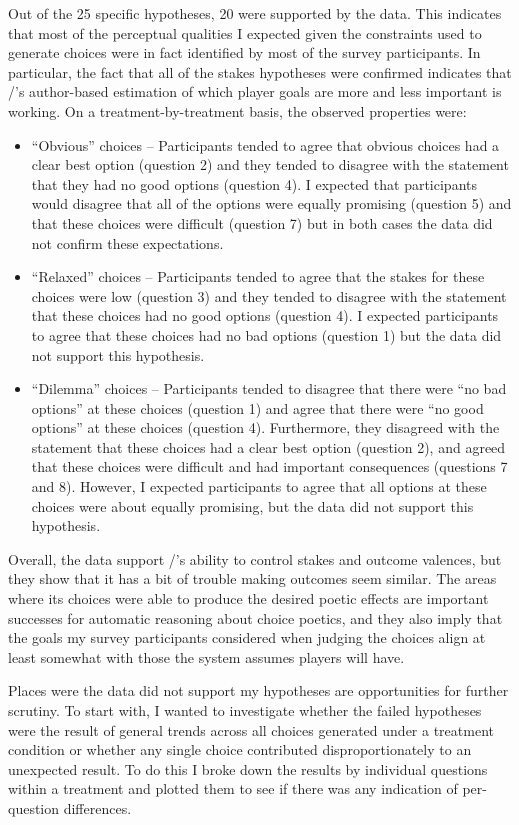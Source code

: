 Out of the 25 specific hypotheses, 20 were supported by the data.
%
This indicates that most of the perceptual qualities I expected given the constraints used to generate choices were in fact identified by most of the survey participants.
%
In particular, the fact that all of the stakes hypotheses were confirmed indicates that \dunyazad/'s author-based estimation of which player goals are more and less important is working.
%
On a treatment-by-treatment basis, the observed properties were:
%
\begin{itemize}
  \item ``Obvious'' choices -- Participants tended to agree that obvious choices had a clear best option (question 2) and they tended to disagree with the statement that they had no good options (question 4). I expected that participants would disagree that all of the options were equally promising (question 5) and that these choices were difficult (question 7) but in both cases the data did not confirm these expectations.
  \item ``Relaxed'' choices -- Participants tended to agree that the stakes for these choices were low (question 3) and they tended to disagree with the statement that these choices had no good options (question 4). I expected participants to agree that these choices had no bad options (question 1) but the data did not support this hypothesis.
  \item ``Dilemma'' choices -- Participants tended to disagree that there were ``no bad options'' at these choices (question 1) and agree that there were ``no good options'' at these choices (question 4). Furthermore, they disagreed with the statement that these choices had a clear best option (question 2), and agreed that these choices were difficult and had important consequences (questions 7 and 8). However, I expected participants to agree that all options at these choices were about equally promising, but the data did not support this hypothesis.
\end{itemize}
%
Overall, the data support \dunyazad/'s ability to control stakes and outcome valences, but they show that it has a bit of trouble making outcomes seem similar.
%
The areas where its choices were able to produce the desired poetic effects are important successes for automatic reasoning about choice poetics, and they also imply that the goals my survey participants considered when judging the choices align at least somewhat with those the system assumes players will have.


Places were the data did not support my hypotheses are opportunities for further scrutiny.
%
To start with, I wanted to investigate whether the failed hypotheses were the result of general trends across all choices generated under a treatment condition or whether any single choice contributed disproportionately to an unexpected result.
%
To do this I broke down the results by individual questions within a treatment and plotted them to see if there was any indication of per-question differences.


